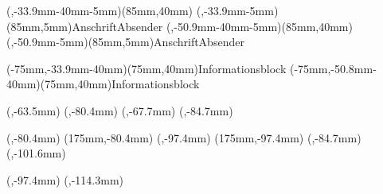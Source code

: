 {{		\boxA(\linksKopf,-33.9mm-40mm-5mm)(85mm,40mm){\anschrift}
		\boxA(\linksKopf,-33.9mm-5mm)(85mm,5mm){AnschriftAbsender}
		\boxB(\linksKopf,-50.9mm-40mm-5mm)(85mm,40mm){\anschrift}
		\boxB(\linksKopf,-50.9mm-5mm)(85mm,5mm){AnschriftAbsender}

		\boxA(\paperwidth-10mm-75mm,-33.9mm-40mm)(75mm,40mm){Informationsblock} %
		\boxB(\paperwidth-10mm-75mm,-50.8mm-40mm)(75mm,40mm){Informationsblock} %
		
		\markA(\linksKopf,-63.5mm)
		\markB(\linksKopf,-80.4mm)
		\markA(\linksKopf,-67.7mm)
		\markB(\linksKopf,-84.7mm)
		
		\markA(\linksStd,-80.4mm)	%
		\markA(175mm,-80.4mm)	%
		\markB(\linksStd,-97.4mm)	%
		\markB(175mm,-97.4mm)	%
		\markA(\linksStd,-84.7mm)
		\markB(\linksStd,-101.6mm)
		
		\markA(\linksStd,-97.4mm)
		\markB(\linksStd,-114.3mm)
	}%
  
}
